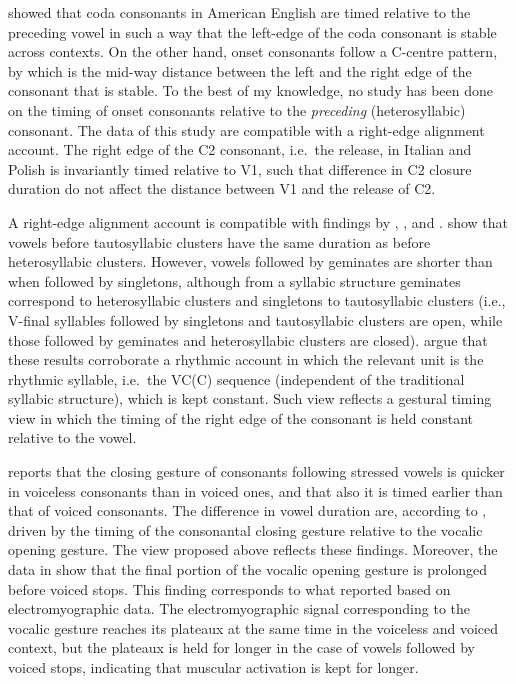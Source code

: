 \documentclass[]{JASAnew}
\begin{document}
\citet{marin2010} showed that coda consonants in American English are
timed relative to the preceding vowel in such a way that the left-edge
of the coda consonant is stable across contexts. On the other hand,
onset consonants follow a C-centre pattern, by which is the mid-way
distance between the left and the right edge of the consonant that is
stable. To the best of my knowledge, no study has been done on the
timing of onset consonants relative to the \emph{preceding}
(heterosyllabic) consonant. The data of this study are compatible with a
right-edge alignment account. The right edge of the C2 consonant,
i.e.~the release, in Italian and Polish is invariantly timed relative to
V1, such that difference in C2 closure duration do not affect the
distance between V1 and the release of C2.

A right-edge alignment account is compatible with findings by
\citet{raphael1975}, \citet{de-jong1991}, and \citet{celata2018}.
\citet{celata2018} show that vowels before tautosyllabic clusters have
the same duration as before heterosyllabic clusters. However, vowels
followed by geminates are shorter than when followed by singletons,
although from a syllabic structure geminates correspond to
heterosyllabic clusters and singletons to tautosyllabic clusters (i.e.,
V-final syllables followed by singletons and tautosyllabic clusters are
open, while those followed by geminates and heterosyllabic clusters are
closed). \citet{celata2018} argue that these results corroborate a
rhythmic account in which the relevant unit is the rhythmic syllable,
i.e.~the VC(C) sequence (independent of the traditional syllabic
structure), which is kept constant. Such view reflects a gestural timing
view in which the timing of the right edge of the consonant is held
constant relative to the vowel.

\citet{de-jong1991} reports that the closing gesture of consonants
following stressed vowels is quicker in voiceless consonants than in
voiced ones, and that also it is timed earlier than that of voiced
consonants. The difference in vowel duration are, according to
\citet{de-jong1991}, driven by the timing of the consonantal closing
gesture relative to the vocalic opening gesture. The view proposed above
reflects these findings. Moreover, the data in \citet{de-jong1991} show
that the final portion of the vocalic opening gesture is prolonged
before voiced stops. This finding corresponds to what
\citet{raphael1975} reported based on electromyographic data. The
electromyographic signal corresponding to the vocalic gesture reaches
its plateaux at the same time in the voiceless and voiced context, but
the plateaux is held for longer in the case of vowels followed by voiced
stops, indicating that muscular activation is kept for longer.
\end{document}
